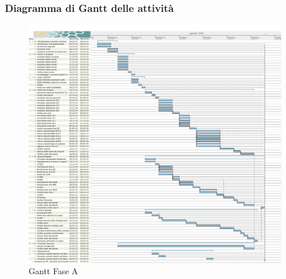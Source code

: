 	\subsubsection{Diagramma di Gantt delle attività}
	\begin{figure}\centering
		\includegraphics[scale=0.27]{PianoDiProgetto/Pics/FaseA.png}
	\caption{Gantt Fase A}
\end{figure}

